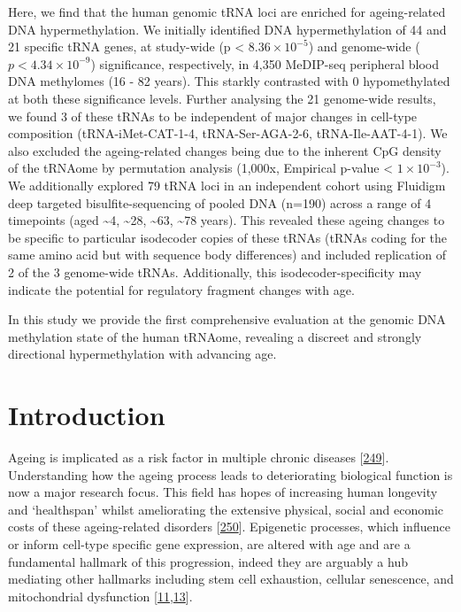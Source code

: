 \documentclass[
]{book}
\begin{document}
Here, we find that the human genomic tRNA loci are enriched for ageing-related DNA hypermethylation.
We initially identified DNA hypermethylation of 44 and 21 specific tRNA genes, at study-wide (p \textless{} \(8.36\times10^{-5}\)) and genome-wide (\(p < 4.34\times10^{-9}\)) significance, respectively, in 4,350 MeDIP-seq peripheral blood DNA methylomes (16 - 82 years).
This starkly contrasted with 0 hypomethylated at both these significance levels.
Further analysing the 21 genome-wide results, we found 3 of these tRNAs to be independent of major changes in cell-type composition (tRNA-iMet-CAT-1-4, tRNA-Ser-AGA-2-6, tRNA-Ile-AAT-4-1).
We also excluded the ageing-related changes being due to the inherent CpG density of the tRNAome by permutation analysis (1,000x, Empirical p-value \textless{} \(1\times10^{-3}\)).
We additionally explored 79 tRNA loci in an independent cohort using Fluidigm deep targeted bisulfite-sequencing of pooled DNA (n=190) across a range of 4 timepoints (aged \textasciitilde4, \textasciitilde28, \textasciitilde63, \textasciitilde78 years).
This revealed these ageing changes to be specific to particular isodecoder copies of these tRNAs (tRNAs coding for the same amino acid but with sequence body differences) and included replication of 2 of the 3 genome-wide tRNAs.
Additionally, this isodecoder-specificity may indicate the potential for regulatory fragment changes with age.

In this study we provide the first comprehensive evaluation at the genomic DNA methylation state of the human tRNAome, revealing a discreet and strongly directional hypermethylation with advancing age.

\newpage

\hypertarget{tRNA-Introduction}{%
\section{Introduction}\label{tRNA-Introduction}}

Ageing is implicated as a risk factor in multiple chronic diseases {[}\protect\hyperlink{ref-Partridge2018}{249}{]}.
Understanding how the ageing process leads to deteriorating biological function is now a major research focus. This field has hopes of increasing human longevity and `healthspan' whilst ameliorating the extensive physical, social and economic costs of these ageing-related disorders {[}\protect\hyperlink{ref-Campisi2019}{250}{]}.
Epigenetic processes, which influence or inform cell-type specific gene expression, are altered with age and are a fundamental hallmark of this progression, indeed they are arguably a hub mediating other hallmarks including stem cell exhaustion, cellular senescence, and mitochondrial dysfunction {[}\protect\hyperlink{ref-Lopez-Otin2013}{11},\protect\hyperlink{ref-Booth2016}{13}{]}.
\end{document}
